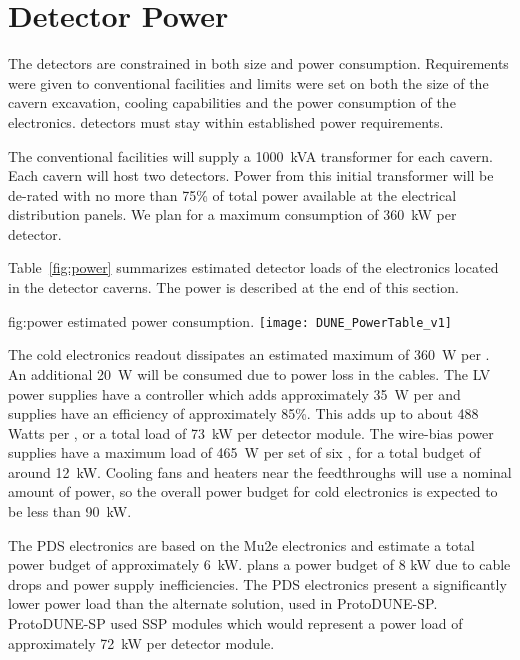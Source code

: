 \section{Detector Power}
\label{sec:fdsp-coord-faci-power}

The  detectors are constrained in both size and power consumption.
Requirements were given to conventional facilities and limits were set
on both the size of the cavern excavation, cooling capabilities and
the power consumption of the electronics.  detectors must stay
within established power requirements.

The conventional facilities will supply a 1000~kVA transformer for
each cavern.  Each cavern will host two  detectors.  Power from
this initial transformer will be de-rated with no more than 75\%
of total power available at the electrical distribution panels.  We
plan for a maximum consumption of 360~kW per detector.

Table~\ref{fig:power} summarizes estimated detector loads of the 
 electronics located in the detector caverns.  The  power is 
described at the end of this section. 
\begin{dunefigure}
{fig:power}
{ estimated power consumption.}
  \texttt{[image: DUNE\_PowerTable\_v1]}
\end{dunefigure}


The cold electronics readout dissipates an estimated maximum of 360~W
per . An additional 20~W will be consumed due to power loss in the
cables.  The LV power supplies have a controller which adds
approximately 35~W per  and supplies have an efficiency of
approximately 85\%. This adds up to about 488 Watts per , or a
total load of 73~kW per detector module. The  wire-bias power
supplies have a maximum load of 465~W per set of six , for a total
budget of around 12~kW. Cooling fans and heaters near the feedthroughs
will use a nominal amount of power, so the overall power budget for
cold electronics is expected to be less than 90~kW.

The PDS electronics are based on the Mu2e electronics and estimate a
total power budget of approximately 6~kW.  plans a power budget of
8 kW due to cable drops and power supply inefficiencies.  The PDS
electronics present a significantly lower power load than the
alternate solution, used in ProtoDUNE-SP.  ProtoDUNE-SP used SSP
modules which would represent a power load of approximately 72~kW per
detector module.

